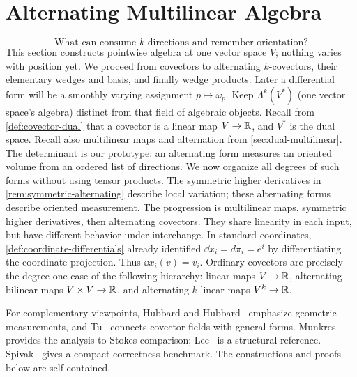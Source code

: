 \section{Alternating Multilinear Algebra}
\label{sec:exterior-covectors}
\[
\boxed{\text{What can consume $k$ directions and remember orientation?}}
\]
This section constructs pointwise algebra at one vector space $V$;
nothing varies with position yet. We proceed from covectors to alternating
$k$-covectors, their elementary wedges and basis, and finally wedge products.
Later a differential form will be a smoothly varying assignment
$p\mapsto\omega_p$. Keep $\Lambda^k(V^*)$ (one vector space's algebra)
distinct from that field of algebraic objects.
Recall from \cref{def:covector-dual} that a covector is a linear
map $V\to\mathbb{R}$, and $V^*$ is the dual space. Recall also multilinear
maps and alternation from \cref{sec:dual-multilinear}. The determinant is our prototype: an alternating
form measures an oriented volume from an ordered list of directions.
We now organize all degrees of such forms without using tensor products.
The symmetric higher derivatives in \cref{rem:symmetric-alternating}
describe local variation; these alternating forms describe oriented
measurement. The progression is multilinear maps, symmetric higher
derivatives, then alternating covectors. They share linearity in each
input, but have different behavior under interchange.
In standard coordinates, \cref{def:coordinate-differentials} already
identified $\dd x_i=d\pi_i=e^i$ by differentiating the coordinate
projection. Thus $\dd x_i(v)=v_i$. Ordinary covectors are precisely the
degree-one case of the following hierarchy: linear maps $V\to\mathbb{R}$,
alternating bilinear maps $V\times V\to\mathbb{R}$, and alternating $k$-linear
maps $V^k\to\mathbb{R}$.

For complementary viewpoints, Hubbard and Hubbard~\cite{hubbard-vector}
emphasize geometric measurements, and Tu~\cite{tu-manifolds} connects
covector fields with general forms. Munkres~\cite{munkres-analysis}
provides the analysis-to-Stokes comparison; Lee~\cite{lee-smooth} is a
structural reference. Spivak~\cite{spivak-manifolds} gives a compact
correctness benchmark. The constructions and proofs below are self-contained.

